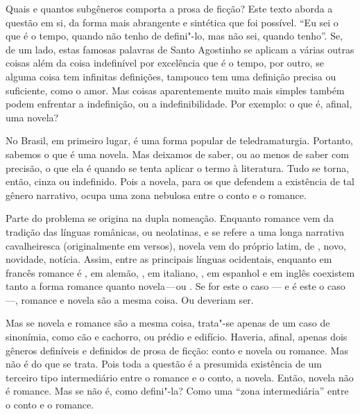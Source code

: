 \begin{changemargin}
\hspace{.5cm}
\vspace*{1cm}
\enlargethispage{-\baselineskip}


\medskip

\hfill{}

\bigskip

Quais e quantos subgêneros comporta a prosa de ficção? Este texto aborda a questão em si, da forma mais abrangente e sintética que foi possível. ``Eu sei o que é o tempo, quando não tenho de defini"-lo, mas não sei, quando tenho''. Se, de um lado, estas famosas palavras de Santo Agostinho se aplicam a várias outras coisas além da coisa indefinível por excelência que é o tempo, por outro, se alguma coisa tem infinitas definições, tampouco tem uma definição precisa ou suficiente, como o amor. Mas coisas aparentemente muito mais simples também podem enfrentar a indefinição, ou a indefinibilidade. Por exemplo: o que é, afinal, uma novela?

No Brasil, em primeiro lugar, é uma forma popular de teledramaturgia. Portanto, sabemos o que é uma novela. Mas deixamos de saber, ou ao menos de saber com precisão, o que ela é quando se tenta aplicar o termo à literatura. Tudo se torna, então, cinza ou indefinido. Pois a novela, para os que defendem a existência de tal gênero narrativo, ocupa uma zona nebulosa entre o conto e o romance.

Parte do problema se origina na dupla nomeação. Enquanto romance vem da tradição das línguas românicas, ou neolatinas, e se refere a uma longa narrativa cavalheiresca (originalmente em versos), novela vem do próprio latim, de {}, novo, novidade, notícia. Assim, entre as principais línguas ocidentais, enquanto em francês romance é {}, em alemão, {}, em italiano, {}, em espanhol e em inglês coexistem tanto a forma romance quanto novela --- ou {}. Se for este o caso --- e é este o caso ---, romance e novela são a mesma coisa. Ou deveriam ser. 

Mas se novela e romance são a mesma coisa, trata"-se apenas de um caso de sinonímia, como cão e cachorro, ou prédio e edifício. Haveria, afinal, apenas dois gêneros definíveis e definidos de prosa de ficção: conto e novela ou romance. Mas não é do que se trata. Pois toda a questão é a presumida existência de um terceiro tipo intermediário entre o romance e o conto, a novela. Então, novela não é romance. Mas se não é, como defini"-la? Como uma ``zona intermediária'' entre o conto e o romance.


\end{changemargin}
